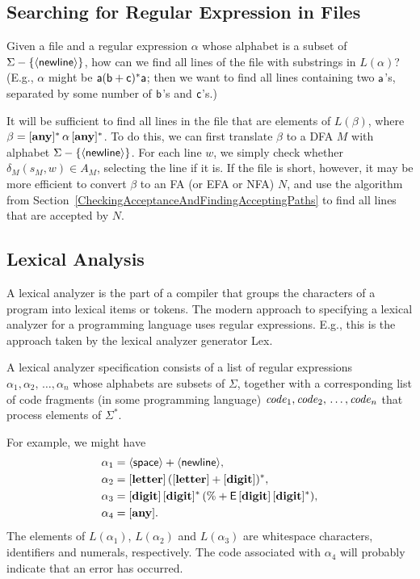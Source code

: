 \subsection{Searching for Regular Expression in Files}

%
Given a file and a regular expression $\alpha$ whose alphabet is a
subset of $\Sigma-\{\mathsf{\langle newline\rangle}\}$, how can we find all lines of the
file with substrings in $L(\alpha)$?  (E.g., $\alpha$ might be
$\mathsf{\mathsf{a}(\mathsf{b}+\mathsf{c})^*\mathsf{a}}$; then we want to find all lines
containing two $\mathsf{a}$'s, separated by some number of $\mathsf{b}$'s and
$\mathsf{c}$'s.)

It will be sufficient to find all lines in the file that are elements
of $L(\beta)$, where $\beta = [\mathbf{any}]^*\,\alpha\,[\mathbf{any}]^*$.  To do this, we
can first translate $\beta$ to a DFA $M$ with alphabet
$\Sigma-\{\mathsf{\langle newline\rangle}\}$.  For each line $w$, we simply check whether
$\delta_M(s_M,w)\in A_M$, selecting the line if it is.  If the file is
short, however, it may be more efficient to convert $\beta$ to an FA
(or EFA or NFA) $N$, and use the algorithm from
Section~\ref{CheckingAcceptanceAndFindingAcceptingPaths} to find all
lines that are accepted by $N$.

\subsection{Lexical Analysis}

%
A lexical analyzer is the part of a compiler that groups the
characters of a program into lexical items or tokens.  The modern
approach to specifying a lexical analyzer for a programming language
uses regular expressions.  E.g., this is the approach taken by the
lexical analyzer generator Lex.

A lexical analyzer specification consists of a list of regular
expressions $\alpha_1,\alpha_2,\,\ldots,\alpha_n$ whose alphabets
are subsets of $\Sigma$, together with a
corresponding list of code fragments (in some programming language)
${\it code}_1,{\it code}_2,\,\ldots,{\it code}_n$ that process elements of
$\Sigma^*$.

For example, we might have
\begin{align*}
\alpha_1 &= \mathsf{\langle space\rangle} + \mathsf{\langle newline\rangle} , \\
\alpha_2 &= [\mathbf{letter}]\,([\mathbf{letter}] + [\mathbf{digit}])^* ,\\
\alpha_3 &= [\mathbf{digit}]\,[\mathbf{digit}]^*\,(\% + \mathsf{E}\,[\mathbf{digit}]\,[\mathbf{digit}]^*) , \\
\alpha_4 &= [\mathbf{any}] .
\end{align*}
The elements of $L(\alpha_1)$, $L(\alpha_2)$ and $L(\alpha_3)$ are
whitespace characters, identifiers and numerals, respectively.  The
code associated with $\alpha_4$ will probably indicate that an error
has occurred.

